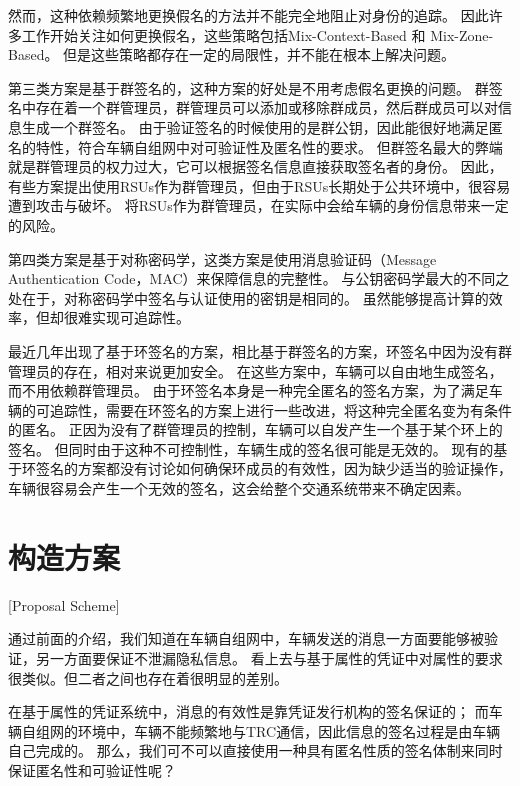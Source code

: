 然而，这种依赖频繁地更换假名的方法并不能完全地阻止对身份的追踪\cite{wiedersheim2010privacy}。
因此许多工作开始关注如何更换假名，这些策略包括Mix-Context-Based 和 Mix-Zone-Based\cite{jemaa2017study,ying2013dynamic,lu2012pseudonym}。
但是这些策略都存在一定的局限性，并不能在根本上解决问题。

第三类方案是基于群签名的，这种方案的好处是不用考虑假名更换的问题。
群签名中存在着一个群管理员，群管理员可以添加或移除群成员，然后群成员可以对信息生成一个群签名。
由于验证签名的时候使用的是群公钥，因此能很好地满足匿名的特性，符合车辆自组网中对可验证性及匿名性的要求。
但群签名最大的弊端就是群管理员的权力过大，它可以根据签名信息直接获取签名者的身份。
因此，有些方案提出使用RSUs作为群管理员\cite{hao2011distributed,park2011rsu}，但由于RSUs长期处于公共环境中，很容易遭到攻击与破坏。
将RSUs作为群管理员，在实际中会给车辆的身份信息带来一定的风险。

第四类方案是基于对称密码学，这类方案是使用消息验证码（Message Authentication Code，MAC）来保障信息的完整性\cite{petit2015pseudonym,choi2005balancing}。
与公钥密码学最大的不同之处在于，对称密码学中签名与认证使用的密钥是相同的。
虽然能够提高计算的效率，但却很难实现可追踪性。

最近几年出现了基于环签名的方案\cite{xiong2010efficient,chaurasia2011conditional,zeng2015privacy}，相比基于群签名的方案，环签名中因为没有群管理员的存在，相对来说更加安全。
在这些方案中，车辆可以自由地生成签名，而不用依赖群管理员。
由于环签名本身是一种完全匿名的签名方案，为了满足车辆的可追踪性，需要在环签名的方案上进行一些改进，将这种完全匿名变为有条件的匿名\cite{张建明2012车辆自组网的位置隐私保护技术研究}。
正因为没有了群管理员的控制，车辆可以自发产生一个基于某个环上的签名。
但同时由于这种不可控制性，车辆生成的签名很可能是无效的。
现有的基于环签名的方案都没有讨论如何确保环成员的有效性，因为缺少适当的验证操作，车辆很容易会产生一个无效的签名，这会给整个交通系统带来不确定因素。

\section{构造方案}[Proposal Scheme]

通过前面的介绍，我们知道在车辆自组网中，车辆发送的消息一方面要能够被验证，另一方面要保证不泄漏隐私信息。
看上去与基于属性的凭证中对属性的要求很类似。但二者之间也存在着很明显的差别。

在基于属性的凭证系统中，消息的有效性是靠凭证发行机构的签名保证的；
而车辆自组网的环境中，车辆不能频繁地与TRC通信，因此信息的签名过程是由车辆自己完成的。
那么，我们可不可以直接使用一种具有匿名性质的签名体制来同时保证匿名性和可验证性呢？

